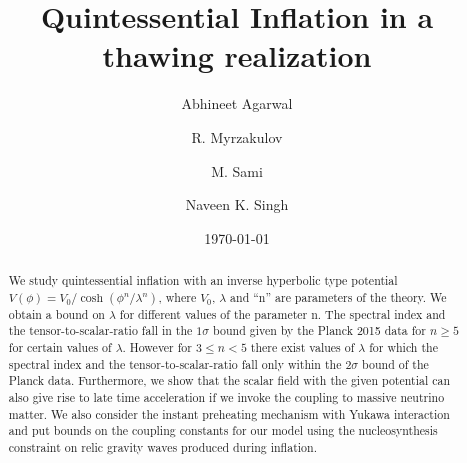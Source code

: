\documentclass[prd,twocolumn,superscriptaddress]{revtex4}
\begin{document}
\begin{abstract}
We study quintessential inflation  with an inverse hyperbolic type potential
$V(\phi) = {V_0}/{\cosh \left( {\phi^n}/{\lambda^n} \right)}$,
where $V_0$, $\lambda$ and ``n'' are parameters of the theory. We obtain a  bound on
$\lambda$ for different values of the parameter n. The spectral index and the tensor-to-scalar-ratio
fall in the $1 \sigma$ bound given by the Planck 2015 data for $n \geq 5$ for certain values of $\lambda$.
However for $3 \leq n < 5$ there exist values of $\lambda$ for which the spectral index and the tensor-to-scalar-ratio
fall only within the $2 \sigma$ bound of the Planck data. Furthermore, we show that the scalar field with
the given potential can also give rise to late time acceleration if we invoke the coupling to massive neutrino matter. We also consider
the instant preheating mechanism with Yukawa interaction and put bounds on the coupling constants for our model using the
nucleosynthesis constraint on relic gravity waves produced during inflation.
\end{abstract}

\title{Quintessential Inflation in a thawing realization}
\author{Abhineet Agarwal}
\author{R. Myrzakulov}
\author{M. Sami}
\author{Naveen K. Singh}
\date{\today}

\maketitle
\end{document}

